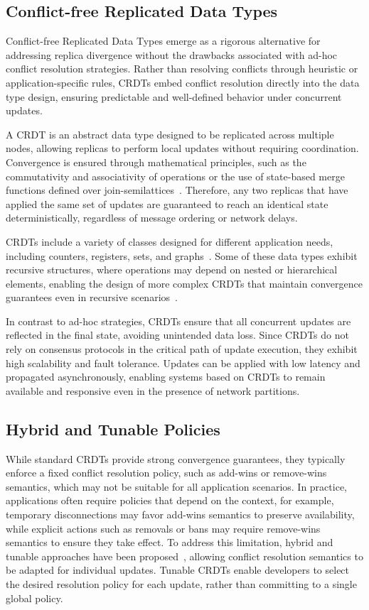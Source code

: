 \subsection{Conflict-free Replicated Data Types}
\label{sub:crdts}

Conflict-free Replicated Data Types emerge as a rigorous alternative for addressing replica divergence without the drawbacks associated with ad-hoc conflict resolution strategies. Rather than resolving conflicts through heuristic or application-specific rules, CRDTs embed conflict resolution directly into the data type design, ensuring predictable and well-defined behavior under concurrent updates.

A CRDT is an abstract data type designed to be replicated across multiple nodes, allowing replicas to perform local updates without requiring coordination. Convergence is ensured through mathematical principles, such as the commutativity and associativity of operations or the use of state-based merge functions defined over join-semilattices~\cite{shapiro2011comprehensive}. Therefore, any two replicas that have applied the same set of updates are guaranteed to reach an identical state deterministically, regardless of message ordering or network delays.

CRDTs include a variety of classes designed for different application needs, including counters, registers, sets, and graphs~\cite{navalho2015crdts}. Some of these data types exhibit recursive structures, where operations may depend on nested or hierarchical elements, enabling the design of more complex CRDTs that maintain convergence guarantees even in recursive scenarios~\cite{baquero2017nested}.

In contrast to ad-hoc strategies, CRDTs ensure that all concurrent updates are reflected in the final state, avoiding unintended data loss. Since CRDTs do not rely on consensus protocols in the critical path of update execution, they exhibit high scalability and fault tolerance. Updates can be applied with low latency and propagated asynchronously, enabling systems based on CRDTs to remain available and responsive even in the presence of network partitions.

\subsection{Hybrid and Tunable Policies}
\label{sub:hybrid}

While standard CRDTs provide strong convergence guarantees, they typically enforce a fixed conflict resolution policy, such as add-wins or remove-wins semantics, which may not be suitable for all application scenarios. In practice, applications often require policies that depend on the context, for example, temporary disconnections may favor add-wins semantics to preserve availability, while explicit actions such as removals or bans may require remove-wins semantics to ensure they take effect. To address this limitation, hybrid and tunable approaches have been proposed~\cite{rijo2018building}, allowing conflict resolution semantics to be adapted for individual updates. Tunable CRDTs enable developers to select the desired resolution policy for each update, rather than committing to a single global policy.

